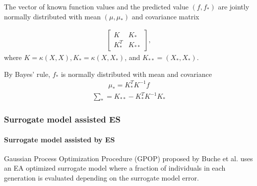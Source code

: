 The vector of known function values and the predicted value $(f,f_*)$ are jointly normally distributed with mean $(\mu,\mu_*)$ and covariance matrix

\begin{align}
\begin{bmatrix}
K & K_*\\
K_*^T&K_{**}
\end{bmatrix},
\end{align}
where $K = \kappa(X,X),K_* = \kappa (X,X_*)$, and $K_{**} = (X_*,X_*)$. 

By Bayes' rule, $f_*$ is normally distributed with mean and covariance 
\begin{align}\label{eqn:GP_mean}{}
\mu_* = K_*^T K^{-1}f
\end{align}
\begin{align}\label{eqn:GP_cov}{}
\sum_* = K_{**}- K_*^TK^{-1}K_*
\end{align}








\subsubsection{Surrogate model assisted ES}\label{sssec:surrogate_assisted_ES}\hfill



\paragraph{Surrogate model assisted by ES}
Gaussian Process Optimization Procedure (GPOP) proposed by Buche et al. \cite{1424193} uses an EA optimized surrogate model where a fraction of individuals in each generation is evaluated depending on the surrogate model error. 

